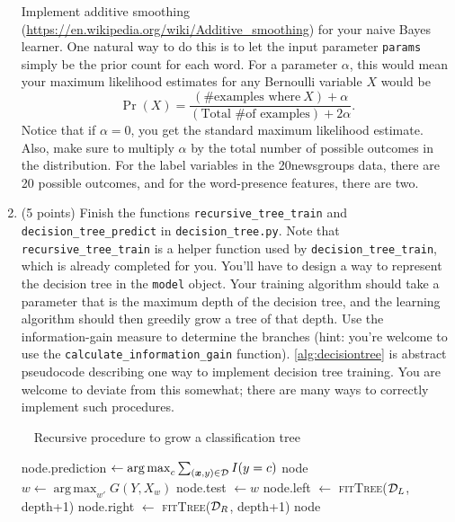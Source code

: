 \documentclass[10pt]{article}
\newcommand{\bx}{{\boldsymbol x}}
\DeclareMathOperator{\argmax}{arg\,max}
\begin{document}
\begin{enumerate}
Implement additive smoothing (\url{https://en.wikipedia.org/wiki/Additive_smoothing}) for your naive Bayes learner. One natural way to do this is to let the input parameter \texttt{params} simply be the prior count for each word. For a parameter $\alpha$, this would mean your maximum likelihood estimates for any Bernoulli variable $X$ would be 
\[
\Pr(X) = \frac{(\textrm{\# examples where}~X) + \alpha}{(\textrm{Total \# of examples}) + 2 \alpha}.
\]
Notice that if $\alpha = 0$, you get the standard maximum likelihood estimate. Also, make sure to multiply $\alpha$ by the total number of possible outcomes in the distribution. For the label variables in the 20newsgroups data, there are 20 possible outcomes, and for the word-presence features, there are two.

\item (5 points) Finish the functions \texttt{recursive\_tree\_train} and \texttt{decision\_tree\_predict} in \texttt{decision\_tree.py}. Note that \texttt{recursive\_tree\_train} is a helper function used by \texttt{decision\_tree\_train}, which is already completed for you. You'll have to design a way to represent the decision tree in the \texttt{model} object. Your training algorithm should take a parameter that is the maximum depth of the decision tree, and the learning algorithm should then greedily grow a tree of that depth. Use the information-gain measure to determine the branches (hint: you're welcome to use the \texttt{calculate\_information\_gain} function). \cref{alg:decisiontree} is abstract pseudocode describing one way to implement decision tree training. You are welcome to deviate from this somewhat; there are many ways to correctly implement such procedures.

\begin{algorithm}[tb]
\begin{center}
\caption{~~Recursive procedure to grow a classification tree}
\label{alg:decisiontree}
\begin{algorithmic}[1]
	\State node.prediction $\leftarrow \argmax_c \sum_{(\bx, y) \in {\cal D}} I( y = c )$
	\State \Return node
	\EndIf
\State $w \leftarrow \argmax_{w'} G(Y, X_w)$ 
\State node.test $\leftarrow w$
\State node.left $\leftarrow$ \textsc{fitTree}(${\cal D}_L$, depth+1)
\Comment{where ${\cal D}_L := \{ (\bx,y) \in {\cal D} | x_w = 0 \}$}
\State node.right $\leftarrow$ \textsc{fitTree}(${\cal D}_R$, depth+1)
\Comment{where ${\cal D}_R := \{ (\bx,y) \in {\cal D} | x_w = 1 \}$}
\State \Return node
\EndFunction
\end{algorithmic}
\end{center}
\end{algorithm}


\end{enumerate}
\end{document}
